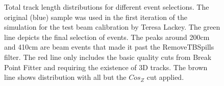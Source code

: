 \documentclass[12pt]{article}
\begin{document}
\begin{figure}

\caption{Total track length distributions for different event selections. The original (blue) sample was used in the first iteration of the simulation for the test beam calibration by Teresa Lackey. The green line depicts the final selection of events. The peaks around 200cm and 410cm are beam events that made it past the RemoveTBSpills filter. The red line only includes the basic quality cuts from Break Point Fitter and requiring the existence of 3D tracks. The brown line shows distribution with all but the $Cos_Z$ cut applied.}
\label{figTotLengthCutComparison}
\end{figure}
\end{document}
